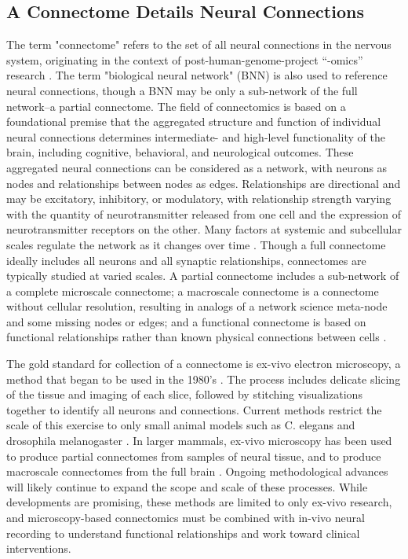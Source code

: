 \documentclass[11pt]{article}
\newcommand{\subsectionwithindent}[1]{
    \subsection*{#1}
    \hspace{\parindent} %
}
\begin{document}
\subsectionwithindent{A Connectome Details Neural Connections}
The term "connectome" refers to the set of all neural connections in the nervous system, originating in the context of post-human-genome-project ``-omics'' research \cite{ciarrusta2023connectome, mahapatra2010omics, green2015hgp}. The term "biological neural network" (BNN) \cite{yamazaki2022spiking} is also used to reference neural connections, though a BNN may be only a sub-network of the full network--a partial connectome. The field of connectomics is based on a foundational premise that the aggregated structure and function of individual neural connections determines intermediate- and high-level functionality of the brain, including cognitive, behavioral, and neurological outcomes. These aggregated neural connections can be considered as a network, with neurons as nodes and relationships between nodes as edges. Relationships are directional and may be excitatory, inhibitory, or modulatory, with relationship strength varying with the quantity of neurotransmitter released from one cell and the expression of neurotransmitter receptors on the other. Many factors at systemic and subcellular scales regulate the network as it changes over time \cite{ciarrusta2023connectome}. Though a full connectome ideally includes all neurons and all synaptic relationships, connectomes are typically studied at varied scales. A partial connectome includes a sub-network of a complete microscale connectome; a macroscale connectome is a connectome without cellular resolution, resulting in analogs of a network science meta-node and some missing nodes or edges; and a functional connectome is based on functional relationships rather than known physical connections between cells \cite{baxter2023functionalconnectome, blommaert2023structuralconnectome, ciarrusta2023connectome, sejnowski2016nanoconnectomics, elam2021hcp}.

The gold standard for collection of a connectome is ex-vivo electron microscopy, a method that began to be used in the 1980's \cite{white1986structure, emmons2015connectomics}. The process includes delicate slicing of the tissue and imaging of each slice, followed by stitching visualizations together to identify all neurons and connections. Current methods restrict the scale of this exercise to only small animal models such as C. elegans and drosophila melanogaster \cite{white1986structure, emmons2015connectomics, scheffer2020connectome}. In larger mammals, ex-vivo microscopy has been used to produce partial connectomes from samples of neural tissue, and to produce macroscale connectomes from the full brain \cite{motta2019connectomicreconstruction, helmstaedter2011high, amunts2013bigbrain}. Ongoing methodological advances will likely continue to expand the scope and scale of these processes. While developments are promising, these methods are limited to only ex-vivo research, and microscopy-based connectomics must be combined with in-vivo neural recording to understand functional relationships and work toward clinical interventions.
\end{document}
